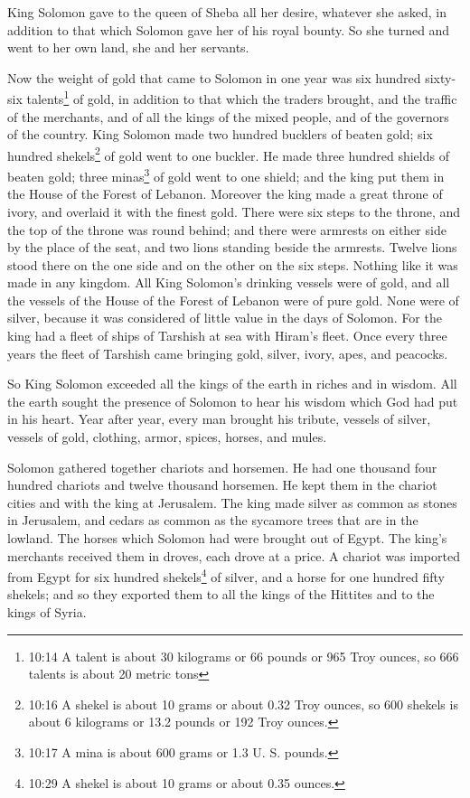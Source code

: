 \myverse{}King Solomon gave to the queen of Sheba all her desire, whatever
she asked, in addition to that which Solomon gave her of his royal bounty. So she turned and went to her
own land, she and her servants.

\myverse{}Now the weight of gold that came to Solomon in one year was
six hundred sixty-six talents\footnote{10:14 A talent is about 30 kilograms or 66 pounds or 965 Troy ounces, so 666 talents is about 20 metric
	tons} of gold,
\myverse{}in addition to that which the traders brought, and the traffic of the merchants,
and of all the kings of the mixed people, and of the governors of the country.
\myverse{}King Solomon made two hundred bucklers of beaten gold; six hundred shekels\footnote{10:16 A shekel is about 10 grams or about 0.32 Troy ounces, so 600 shekels is about 6 kilograms or
	13.2 pounds or 192 Troy ounces.} of gold went to one buckler.
\myverse{}He made three hundred shields of beaten gold; three minas\footnote{10:17 A mina is about 600 grams or 1.3 U. S. pounds.} of gold went to one shield; and the king
put them in the House of the Forest of Lebanon.
\myverse{}Moreover the king made a great throne of ivory, and overlaid it with the
finest gold.
\myverse{}There were six steps to the throne, and the top of the throne was round behind;
and there were armrests on either side by the place of the seat, and two lions standing beside the armrests.
\myverse{}Twelve lions stood there on the one side and on the other on the six steps.
Nothing like it was made in any kingdom.
\myverse{}All King Solomon’s drinking vessels were of gold, and all the vessels of
the House of the Forest of Lebanon were of pure gold. None were of silver, because it was considered of
little value in the days of Solomon.
\myverse{}For the king had a fleet of ships of Tarshish at sea with Hiram’s fleet.
Once every three years the fleet of Tarshish came bringing gold, silver, ivory, apes, and peacocks.

\myverse{}So King Solomon exceeded all the kings of the earth in riches
and in wisdom.
\myverse{}All the earth sought the presence of Solomon to hear his wisdom which God
had put in his heart.
\myverse{}Year after year, every man brought his tribute, vessels of silver, vessels
of gold, clothing, armor, spices, horses, and mules.

\myverse{}Solomon gathered together chariots and horsemen. He had one
thousand four hundred chariots and twelve thousand horsemen. He kept them in the chariot cities and with
the king at Jerusalem.
\myverse{}The king made silver as common as stones in Jerusalem, and cedars as common
as the sycamore trees that are in the lowland.
\myverse{}The horses which Solomon had were brought out of Egypt. The king’s merchants
received them in droves, each drove at a price.
\myverse{}A chariot was imported from Egypt for six hundred shekels\footnote{10:29 A shekel is about 10 grams or about 0.35 ounces.} of silver, and a horse for one hundred
fifty shekels; and so they exported them to all the kings of the Hittites and to the kings of Syria.


